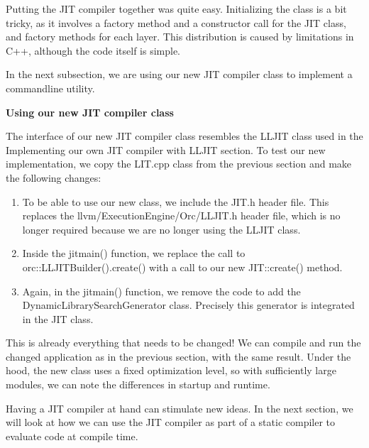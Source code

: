 Putting the JIT compiler together was quite easy. Initializing the class is a bit tricky, as it involves a factory method and a constructor call for the JIT class, and factory methods for each layer. This distribution is caused by limitations in C++, although the code itself is simple.\par

In the next subsection, we are using our new JIT compiler class to implement a commandline utility.\par

\hspace*{\fill} \par %
\textbf{Using our new JIT compiler class}

The interface of our new JIT compiler class resembles the LLJIT class used in the Implementing our own JIT compiler with LLJIT section. To test our new implementation, we copy the LIT.cpp class from the previous section and make the following changes:\par

\begin{enumerate}
\item To be able to use our new class, we include the JIT.h header file. This replaces the llvm/ExecutionEngine/Orc/LLJIT.h header file, which is no longer required because we are no longer using the LLJIT class.

\item Inside the jitmain() function, we replace the call to orc::LLJITBuilder().create() with a call to our new JIT::create() method.

\item Again, in the jitmain() function, we remove the code to add the DynamicLibrarySearchGenerator class. Precisely this generator is integrated in the JIT class.
\end{enumerate}

This is already everything that needs to be changed! We can compile and run the changed application as in the previous section, with the same result. Under the hood, the new class uses a fixed optimization level, so with sufficiently large modules, we can note the differences in startup and runtime.\par

Having a JIT compiler at hand can stimulate new ideas. In the next section, we will look at how we can use the JIT compiler as part of a static compiler to evaluate code at compile time.\par













